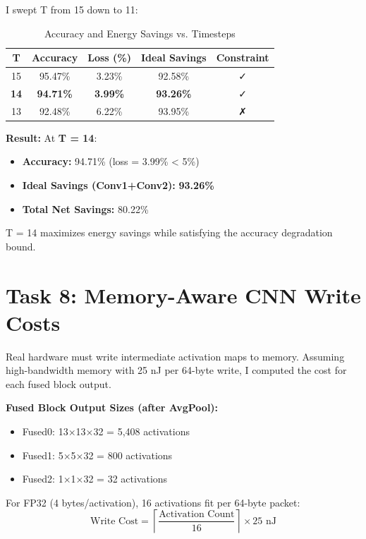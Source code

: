 \documentclass[11pt, a4paper]{article}
\begin{document}
I swept T from 15 down to 11:

\begin{table}[htbp]
  \centering
  \caption{Accuracy and Energy Savings vs. Timesteps}
  \label{tab:energy_sweep}
  \renewcommand{\arraystretch}{1.2}
  \begin{tabular}{c c c c c}
    \toprule
    \textbf{T} & \textbf{Accuracy} & \textbf{Loss (\%)} & \textbf{Ideal Savings} & \textbf{Constraint} \\
    \midrule
    15 & 95.47\% & 3.23\% & 92.58\% & ✓ \\
    \textbf{14} & \textbf{94.71\%} & \textbf{3.99\%} & \textbf{93.26\%} & ✓ \\
    13 & 92.48\% & 6.22\% & 93.95\% & ✗ \\
    \bottomrule
  \end{tabular}
\end{table}

\textbf{Result:} At \textbf{T = 14}:
\begin{itemize}
    \item \textbf{Accuracy:} 94.71\% (loss = 3.99\% < 5\%)
    \item \textbf{Ideal Savings (Conv1+Conv2):} \textbf{93.26\%}
    \item \textbf{Total Net Savings:} 80.22\%
\end{itemize}

T = 14 maximizes energy savings while satisfying the accuracy degradation bound.

\section{Task 8: Memory-Aware CNN Write Costs}

Real hardware must write intermediate activation maps to memory. Assuming high-bandwidth memory with 25 nJ per 64-byte write, I computed the cost for each fused block output.

\textbf{Fused Block Output Sizes (after AvgPool):}
\begin{itemize}
    \item Fused0: 13×13×32 = 5,408 activations
    \item Fused1: 5×5×32 = 800 activations
    \item Fused2: 1×1×32 = 32 activations
\end{itemize}

For FP32 (4 bytes/activation), 16 activations fit per 64-byte packet:
\[
\text{Write Cost} = \left\lceil \frac{\text{Activation Count}}{16} \right\rceil \times 25 \text{ nJ}
\]
\end{document}
